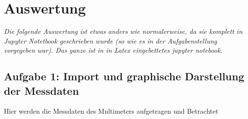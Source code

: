 
    \hypertarget{auswertung-verusch-243}{%
\section{Auswertung}\label{auswertung-verusch-243}}

\emph{Die folgende Auswertung ist etwas anders wie normalerweise, da sie komplett in Jupyter Notetbook geschrieben wurde (so wie es in der Aufgabenstellung vorgegeben war). Das ganze ist in in Latex eingebettetes jupyter notebook.}

\hypertarget{aufgabe-1-import-und-graphische-darstellung-der-messdaten}{%
\subsection{Aufgabe 1: Import und graphische Darstellung der
Messdaten}\label{aufgabe-1-import-und-graphische-darstellung-der-messdaten}}

Hier werden die Messdaten des Multimeters aufgetragen und Betrachtet

